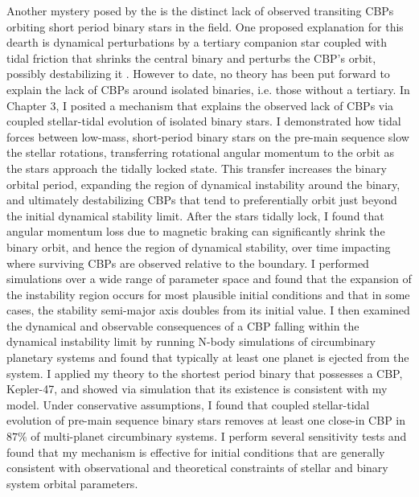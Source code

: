 Another mystery posed by the \kepler is the distinct lack of observed transiting CBPs orbiting short period binary stars in the \kepler field. One proposed explanation for this dearth is dynamical perturbations by a tertiary companion star coupled with tidal friction that shrinks the central binary and perturbs the CBP's orbit, possibly destabilizing it \citep{Munoz2015,Martin2015b,Hamers2016}.  However to date, no theory has been put forward to explain the lack of CBPs around isolated binaries, i.e. those without a tertiary. In Chapter 3, I posited a mechanism that explains the observed lack of CBPs via coupled stellar-tidal evolution of isolated binary stars. I demonstrated how tidal forces between low-mass, short-period binary stars on the pre-main sequence slow the stellar rotations, transferring rotational angular momentum to the orbit as the stars approach the tidally locked state.  This transfer increases the binary orbital period, expanding the region of dynamical instability around the binary, and ultimately destabilizing CBPs that tend to preferentially orbit just beyond the initial dynamical stability limit.  After the stars tidally lock, I found that angular momentum loss due to magnetic braking can significantly shrink the binary orbit, and hence the region of dynamical stability, over time impacting where surviving CBPs are observed relative to the boundary.  I performed simulations over a wide range of parameter space and found that the expansion of the instability region occurs for most plausible initial conditions and that in some cases, the stability semi-major axis doubles from its initial value.  I then examined the dynamical and observable consequences of a CBP falling within the dynamical instability limit by running N-body simulations of circumbinary planetary systems and found that typically at least one planet is ejected from the system.  I applied my theory to the shortest period \kepler binary that possesses a CBP, Kepler-47, and showed via simulation that its existence is consistent with my model.  Under conservative assumptions, I found that coupled stellar-tidal evolution of pre-main sequence binary stars removes at least one close-in CBP in $87\%$ of multi-planet circumbinary systems. I perform several sensitivity tests and found that my mechanism is effective for initial conditions that are generally consistent with observational and theoretical constraints of stellar and binary system orbital parameters. 

